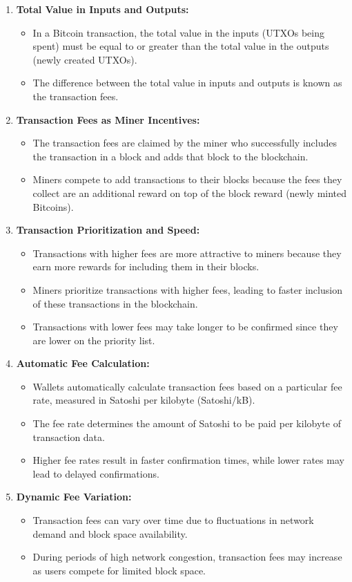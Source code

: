 \begin{enumerate}
    \item \textbf{Total Value in Inputs and Outputs:} 
    \begin{itemize}
        \item In a Bitcoin transaction, the total value in the inputs (UTXOs being spent) must be equal to or greater than the total value in the outputs (newly created UTXOs).
        \item The difference between the total value in inputs and outputs is known as the transaction fees.
    \end{itemize}
    \item \textbf{Transaction Fees as Miner Incentives:}
    \begin{itemize}
        \item The transaction fees are claimed by the miner who successfully includes the transaction in a block and adds that block to the blockchain.
        \item Miners compete to add transactions to their blocks because the fees they collect are an additional reward on top of the block reward (newly minted Bitcoins).
    \end{itemize}
    \item \textbf{Transaction Prioritization and Speed:}
    \begin{itemize}
        \item Transactions with higher fees are more attractive to miners because they earn more rewards for including them in their blocks.
        \item Miners prioritize transactions with higher fees, leading to faster inclusion of these transactions in the blockchain.
        \item Transactions with lower fees may take longer to be confirmed since they are lower on the priority list.
    \end{itemize}
    \item \textbf{Automatic Fee Calculation:}
    \begin{itemize}
        \item Wallets automatically calculate transaction fees based on a particular fee rate, measured in Satoshi per kilobyte (Satoshi/kB).
        \item The fee rate determines the amount of Satoshi to be paid per kilobyte of transaction data.
        \item Higher fee rates result in faster confirmation times, while lower rates may lead to delayed confirmations.
    \end{itemize}
    \item \textbf{Dynamic Fee Variation:}
        \begin{itemize}
        \item Transaction fees can vary over time due to fluctuations in network demand and block space availability.
        \item During periods of high network congestion, transaction fees may increase as users compete for limited block space.
    \end{itemize}
\end{enumerate}


